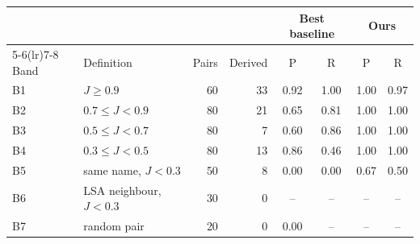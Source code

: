 \begin{tabular}{llrrcccc}
\toprule
 & & & & \multicolumn{2}{c}{Best baseline} & \multicolumn{2}{c}{Ours} \\
\cmidrule(lr){5-6}\cmidrule(lr){7-8}
Band & Definition & Pairs & Derived & P & R & P & R \\
\midrule
B1 & $J \geq 0.9$ & 60 & 33 & 0.92 & 1.00 & 1.00 & 0.97 \\
B2 & $0.7 \leq J < 0.9$ & 80 & 21 & 0.65 & 0.81 & 1.00 & 1.00 \\
B3 & $0.5 \leq J < 0.7$ & 80 & 7 & 0.60 & 0.86 & 1.00 & 1.00 \\
B4 & $0.3 \leq J < 0.5$ & 80 & 13 & 0.86 & 0.46 & 1.00 & 1.00 \\
B5 & same name, $J<0.3$ & 50 & 8 & 0.00 & 0.00 & 0.67 & 0.50 \\
B6 & LSA neighbour, $J<0.3$ & 30 & 0 & -- & -- & -- & -- \\
B7 & random pair & 20 & 0 & 0.00 & -- & -- & -- \\
\bottomrule
\end{tabular}
